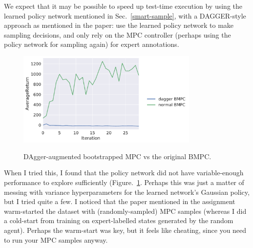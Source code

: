 \documentclass{article}
\begin{document}
We expect that it may be possible to speed up test-time execution by using the learned policy network mentioned in Sec.~\ref{smart-sample}, with a DAGGER-style approach as mentioned in the paper: use the learned policy network to make sampling decisions, and only rely on the MPC controller (perhaps using the policy network for sampling again) for expert annotations.

\begin{figure}[!h]
  \begin{center}
    {\includegraphics[width=0.8\textwidth]{dag-AverageReturn.pdf}}
  \end{center}
  \caption{DAgger-augmented bootstrapped MPC vs the original BMPC.}
\label{fig:dag}
\end{figure}

When I tried this, I found that the policy network did not have variable-enough performance to explore sufficiently (Figure.~\ref{fig:dag}. Perhaps this was just a matter of messing with variance hyperparameters for the learned network's Gaussian policy, but I tried quite a few. I noticed that the paper mentioned in the assignment warm-started the dataset with (randomly-sampled) MPC samples (whereas I did a cold-start from training on expert-labelled states generated by the random agent). Perhaps the warm-start was key, but it feels like cheating, since you need to run your MPC samples anyway.
\end{document}
